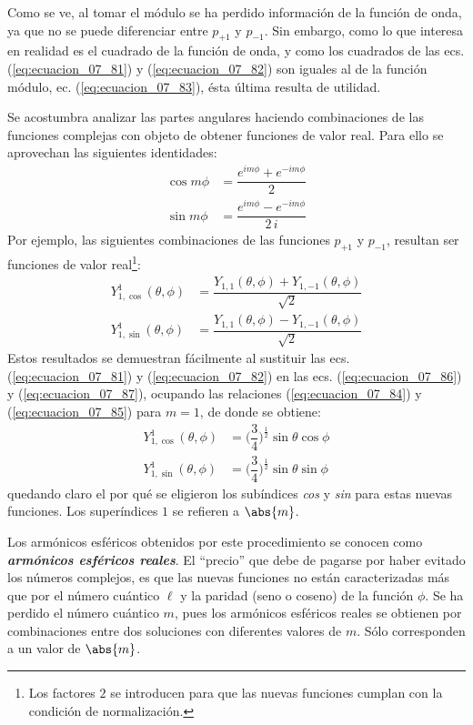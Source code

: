 Como se ve, al tomar el módulo se ha perdido información de la función de onda, ya que no se puede diferenciar entre $p_{+1}$ y $p_{-1}$. Sin embargo, como lo que interesa en realidad es el cuadrado de la función de onda, y como los cuadrados de las ecs. (\ref{eq:ecuacion_07_81}) y (\ref{eq:ecuacion_07_82}) son iguales al de la función módulo, ec. (\ref{eq:ecuacion_07_83}), ésta última resulta de utilidad.
\par
Se acostumbra analizar las partes angulares haciendo combinaciones de las funciones complejas con objeto de obtener funciones de valor real. Para ello se aprovechan las siguientes identidades:
\begin{align}
\cos m \phi &= \dfrac{e^{i m \phi} + e^{-i m \phi}}{2} \label{eq:ecuacion_07_84} \\[0.5em]
\sin m \phi &= \dfrac{e^{i m \phi} - e^{-i m \phi}}{2 \, i} \label{eq:ecuacion_07_85}
\end{align}
Por ejemplo, las siguientes combinaciones de las funciones $p_{+1}$ y $p_{-1}$, resultan ser funciones de valor real\footnote{Los factores $2$ se introducen para que las nuevas funciones cumplan con la condición de normalización.}:
\begin{align}
Y_{1, \cos}^{1} (\theta, \phi) &= \dfrac{Y_{1,1} (\theta, \phi) + Y_{1, -1} (\theta, \phi)}{\sqrt{2}} \label{eq:ecuacion_07_86} \\[0.5em]
Y_{1, \sin}^{1} (\theta, \phi) &= \dfrac{Y_{1,1} (\theta, \phi) - Y_{1, -1} (\theta, \phi)}{\sqrt{2}} \label{eq:ecuacion_07_87}
\end{align}
Estos resultados se demuestran fácilmente al sustituir las ecs. (\ref{eq:ecuacion_07_81}) y (\ref{eq:ecuacion_07_82}) en las ecs. (\ref{eq:ecuacion_07_86}) y (\ref{eq:ecuacion_07_87}), ocupando las relaciones (\ref{eq:ecuacion_07_84}) y (\ref{eq:ecuacion_07_85}) para $m = 1$, de donde se obtiene:
\begin{align}
Y_{1, \cos}^{1} (\theta, \phi) &= \bigg( \dfrac{3}{4} \bigg)^{\frac{1}{2}} \sin \theta \cos \phi \label{eq:ecuacion_07_88} \\[0.5em]
Y_{1, \sin}^{1} (\theta, \phi) &= \bigg( \dfrac{3}{4} \bigg)^{\frac{1}{2}} \sin \theta \sin \phi \label{eq:ecuacion_07_89}
\end{align}
quedando claro el por qué se eligieron los subíndices \emph{cos} y \emph{sin} para estas nuevas funciones. Los superíndices $1$ se refieren a $\abs{m}$.
\par
Los armónicos esféricos obtenidos por este procedimiento se conocen como \textbf{\textit{armónicos esféricos reales}}. El \enquote{precio} que debe de pagarse por haber evitado los números complejos, es que las nuevas funciones no están caracterizadas más que por el número cuántico $\ell$ y la paridad (seno o coseno) de la función $\phi$. Se ha perdido el número cuántico $m$, pues los armónicos esféricos reales se obtienen por combinaciones entre dos soluciones con diferentes valores de $m$. Sólo corresponden a un valor de $\abs{m}$.

